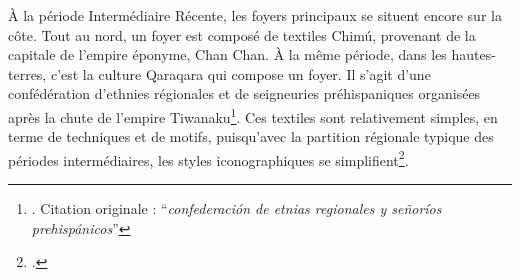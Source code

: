 À la période Intermédiaire Récente, les foyers principaux se situent encore sur la côte. Tout au nord, un foyer est composé de textiles Chimú, provenant de la capitale de l'empire éponyme, Chan Chan. À la même période, dans les hautes-terres, c'est la culture Qaraqara qui compose un foyer. Il s'agit d'une \og confédération d'ethnies régionales et de seigneuries préhispaniques \fg \:organisées après la chute de l'empire Tiwanaku\footnote{\cite[p.~309]{oriasReviewQaraqaraCharkaMallku2009}. Citation originale : \textquotedblleft \textit{confederación de etnias regionales y señoríos prehispánicos}\textquotedblright}. Ces textiles sont relativement simples, en terme de techniques et de motifs, puisqu'avec la partition régionale typique des périodes intermédiaires, les styles iconographiques se simplifient\footcite[p.~288]{coveyMultiregionalPerspectivesArchaeology2008}.
